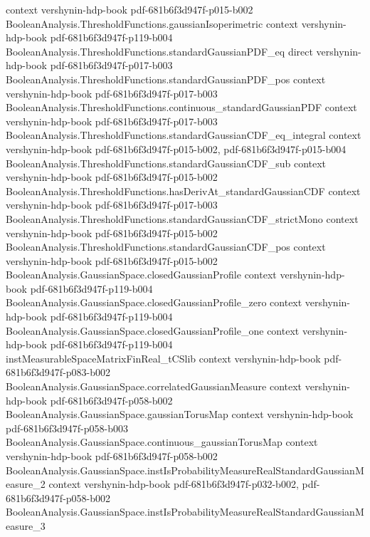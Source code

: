 \begin{theorem}
  {context}
  {vershynin-hdp-book}
  {pdf-681b6f3d947f-p015-b002}
\proofstep
  {BooleanAnalysis.ThresholdFunctions.gaussianIsoperimetric}
  {context}
  {vershynin-hdp-book}
  {pdf-681b6f3d947f-p119-b004}
\proofstep
  {BooleanAnalysis.ThresholdFunctions.standardGaussianPDF_eq}
  {direct}
  {vershynin-hdp-book}
  {pdf-681b6f3d947f-p017-b003}
\proofstep
  {BooleanAnalysis.ThresholdFunctions.standardGaussianPDF_pos}
  {context}
  {vershynin-hdp-book}
  {pdf-681b6f3d947f-p017-b003}
\proofstep
  {BooleanAnalysis.ThresholdFunctions.continuous_standardGaussianPDF}
  {context}
  {vershynin-hdp-book}
  {pdf-681b6f3d947f-p017-b003}
\proofstep
  {BooleanAnalysis.ThresholdFunctions.standardGaussianCDF_eq_integral}
  {context}
  {vershynin-hdp-book}
  {pdf-681b6f3d947f-p015-b002,
    pdf-681b6f3d947f-p015-b004}
\proofstep
  {BooleanAnalysis.ThresholdFunctions.standardGaussianCDF_sub}
  {context}
  {vershynin-hdp-book}
  {pdf-681b6f3d947f-p015-b002}
\proofstep
  {BooleanAnalysis.ThresholdFunctions.hasDerivAt_standardGaussianCDF}
  {context}
  {vershynin-hdp-book}
  {pdf-681b6f3d947f-p017-b003}
\proofstep
  {BooleanAnalysis.ThresholdFunctions.standardGaussianCDF_strictMono}
  {context}
  {vershynin-hdp-book}
  {pdf-681b6f3d947f-p015-b002}
\proofstep
  {BooleanAnalysis.ThresholdFunctions.standardGaussianCDF_pos}
  {context}
  {vershynin-hdp-book}
  {pdf-681b6f3d947f-p015-b002}
\proofstep
  {BooleanAnalysis.GaussianSpace.closedGaussianProfile}
  {context}
  {vershynin-hdp-book}
  {pdf-681b6f3d947f-p119-b004}
\proofstep
  {BooleanAnalysis.GaussianSpace.closedGaussianProfile_zero}
  {context}
  {vershynin-hdp-book}
  {pdf-681b6f3d947f-p119-b004}
\proofstep
  {BooleanAnalysis.GaussianSpace.closedGaussianProfile_one}
  {context}
  {vershynin-hdp-book}
  {pdf-681b6f3d947f-p119-b004}
\proofstep
  {instMeasurableSpaceMatrixFinReal_tCSlib}
  {context}
  {vershynin-hdp-book}
  {pdf-681b6f3d947f-p083-b002}
\proofstep
  {BooleanAnalysis.GaussianSpace.correlatedGaussianMeasure}
  {context}
  {vershynin-hdp-book}
  {pdf-681b6f3d947f-p058-b002}
\proofstep
  {BooleanAnalysis.GaussianSpace.gaussianTorusMap}
  {context}
  {vershynin-hdp-book}
  {pdf-681b6f3d947f-p058-b003}
\proofstep
  {BooleanAnalysis.GaussianSpace.continuous_gaussianTorusMap}
  {context}
  {vershynin-hdp-book}
  {pdf-681b6f3d947f-p058-b002}
\proofstep
  {BooleanAnalysis.GaussianSpace.instIsProbabilityMeasureRealStandardGaussianMeasure_2}
  {context}
  {vershynin-hdp-book}
  {pdf-681b6f3d947f-p032-b002,
    pdf-681b6f3d947f-p058-b002}
\proofstep
  {BooleanAnalysis.GaussianSpace.instIsProbabilityMeasureRealStandardGaussianMeasure_3}

\end{theorem}
